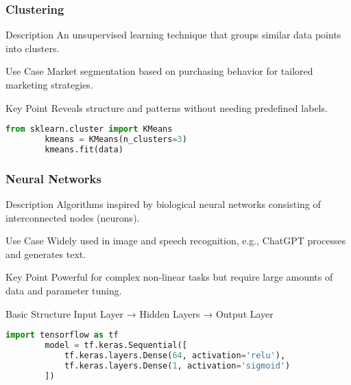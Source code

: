 \documentclass[aspectratio=169]{beamer}
\begin{document}
\begin{frame}[fragile]
    \frametitle{Clustering}
    
    \begin{block}{Description}
        An unsupervised learning technique that groups similar data points into clusters.
    \end{block}
    
    \begin{block}{Use Case}
        Market segmentation based on purchasing behavior for tailored marketing strategies.
    \end{block}
    
    \begin{block}{Key Point}
        Reveals structure and patterns without needing predefined labels.
    \end{block}
    
    \begin{example}
        \begin{lstlisting}[language=Python]
        from sklearn.cluster import KMeans
        kmeans = KMeans(n_clusters=3)
        kmeans.fit(data)
        \end{lstlisting}
    \end{example}

\end{frame}

\begin{frame}[fragile]
    \frametitle{Neural Networks}
    
    \begin{block}{Description}
        Algorithms inspired by biological neural networks consisting of interconnected nodes (neurons).
    \end{block}
    
    \begin{block}{Use Case}
        Widely used in image and speech recognition, e.g., ChatGPT processes and generates text.
    \end{block}
    
    \begin{block}{Key Point}
        Powerful for complex non-linear tasks but require large amounts of data and parameter tuning.
    \end{block}

    \begin{block}{Basic Structure}
        Input Layer → Hidden Layers → Output Layer
    \end{block}

    \begin{example}
        \begin{lstlisting}[language=Python]
        import tensorflow as tf
        model = tf.keras.Sequential([
            tf.keras.layers.Dense(64, activation='relu'),
            tf.keras.layers.Dense(1, activation='sigmoid')
        ])
        \end{lstlisting}
    \end{example}
    
\end{frame}
\end{document}
